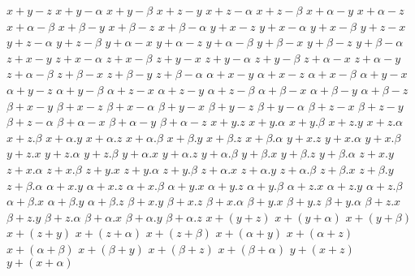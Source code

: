 $ x + y - z $
$ x + y - \alpha $
$ x + y - \beta $
$ x + z - y $
$ x + z - \alpha $
$ x + z - \beta $
$ x + \alpha - y $
$ x + \alpha - z $
$ x + \alpha - \beta $
$ x + \beta - y $
$ x + \beta - z $
$ x + \beta - \alpha $
$ y + x - z $
$ y + x - \alpha $
$ y + x - \beta $
$ y + z - x $
$ y + z - \alpha $
$ y + z - \beta $
$ y + \alpha - x $
$ y + \alpha - z $
$ y + \alpha - \beta $
$ y + \beta - x $
$ y + \beta - z $
$ y + \beta - \alpha $
$ z + x - y $
$ z + x - \alpha $
$ z + x - \beta $
$ z + y - x $
$ z + y - \alpha $
$ z + y - \beta $
$ z + \alpha - x $
$ z + \alpha - y $
$ z + \alpha - \beta $
$ z + \beta - x $
$ z + \beta - y $
$ z + \beta - \alpha $
$ \alpha + x - y $
$ \alpha + x - z $
$ \alpha + x - \beta $
$ \alpha + y - x $
$ \alpha + y - z $
$ \alpha + y - \beta $
$ \alpha + z - x $
$ \alpha + z - y $
$ \alpha + z - \beta $
$ \alpha + \beta - x $
$ \alpha + \beta - y $
$ \alpha + \beta - z $
$ \beta + x - y $
$ \beta + x - z $
$ \beta + x - \alpha $
$ \beta + y - x $
$ \beta + y - z $
$ \beta + y - \alpha $
$ \beta + z - x $
$ \beta + z - y $
$ \beta + z - \alpha $
$ \beta + \alpha - x $
$ \beta + \alpha - y $
$ \beta + \alpha - z $
$ x + y . z $
$ x + y . \alpha $
$ x + y . \beta $
$ x + z . y $
$ x + z . \alpha $
$ x + z . \beta $
$ x + \alpha . y $
$ x + \alpha . z $
$ x + \alpha . \beta $
$ x + \beta . y $
$ x + \beta . z $
$ x + \beta . \alpha $
$ y + x . z $
$ y + x . \alpha $
$ y + x . \beta $
$ y + z . x $
$ y + z . \alpha $
$ y + z . \beta $
$ y + \alpha . x $
$ y + \alpha . z $
$ y + \alpha . \beta $
$ y + \beta . x $
$ y + \beta . z $
$ y + \beta . \alpha $
$ z + x . y $
$ z + x . \alpha $
$ z + x . \beta $
$ z + y . x $
$ z + y . \alpha $
$ z + y . \beta $
$ z + \alpha . x $
$ z + \alpha . y $
$ z + \alpha . \beta $
$ z + \beta . x $
$ z + \beta . y $
$ z + \beta . \alpha $
$ \alpha + x . y $
$ \alpha + x . z $
$ \alpha + x . \beta $
$ \alpha + y . x $
$ \alpha + y . z $
$ \alpha + y . \beta $
$ \alpha + z . x $
$ \alpha + z . y $
$ \alpha + z . \beta $
$ \alpha + \beta . x $
$ \alpha + \beta . y $
$ \alpha + \beta . z $
$ \beta + x . y $
$ \beta + x . z $
$ \beta + x . \alpha $
$ \beta + y . x $
$ \beta + y . z $
$ \beta + y . \alpha $
$ \beta + z . x $
$ \beta + z . y $
$ \beta + z . \alpha $
$ \beta + \alpha . x $
$ \beta + \alpha . y $
$ \beta + \alpha . z $
$ x + (y + z) $
$ x + (y + \alpha) $
$ x + (y + \beta) $
$ x + (z + y) $
$ x + (z + \alpha) $
$ x + (z + \beta) $
$ x + (\alpha + y) $
$ x + (\alpha + z) $
$ x + (\alpha + \beta) $
$ x + (\beta + y) $
$ x + (\beta + z) $
$ x + (\beta + \alpha) $
$ y + (x + z) $
$ y + (x + \alpha) $
